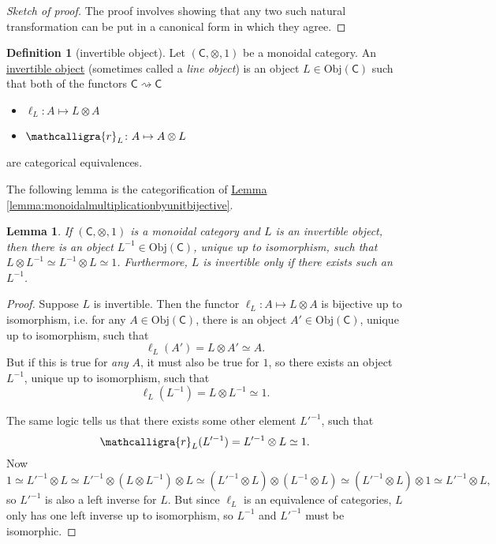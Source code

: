 \documentclass[a4paper]{report}
\newcommand{\sr}{\ensuremath{\mathcalligra{r}}}
\newcommand{\defn}[1]{\ul{#1}}
\newcommand{\Obj}{\mathrm{Obj}}
\theoremstyle{definition}
\newtheorem{definition}{Definition}[section]
\theoremstyle{plain}
\newtheorem{lemma}{Lemma}[section]
\theoremstyle{remark}
\begin{document}
\begin{proof}[Sketch of proof]
  The proof involves showing that any two such natural transformation can be put in a canonical form in which they agree.
\end{proof}

\begin{definition}[invertible object]
  \label{def:invertibleobject}
  Let $(\mathsf{C}, \otimes, 1)$ be a monoidal category. An \defn{invertible object} (sometimes called a \emph{line object}) is an object $L \in \Obj(\mathsf{C})$ such that both of the functors $\mathsf{C} \rightsquigarrow \mathsf{C}$
  \begin{itemize}
    \item $\ell_{L}\colon A \mapsto L \otimes A$ 
    \item $\sr_{L}\colon A \mapsto A \otimes L$
  \end{itemize}
  are categorical equivalences.
\end{definition}

The following lemma is the categorification of \hyperref[lemma:monoidalmultiplicationbyunitbijective]{Lemma \ref*{lemma:monoidalmultiplicationbyunitbijective}}.
\begin{lemma}
  If $(\mathsf{C}, \otimes, 1)$ is a monoidal category and $L$ is an invertible object, then there is an object $L^{-1} \in \Obj(\mathsf{C})$, unique up to isomorphism, such that $L \otimes L^{-1} \simeq L^{-1} \otimes L \simeq 1$. Furthermore, $L$ is invertible only if there exists such an $L^{-1}$.
\end{lemma}
\begin{proof}
  Suppose $L$ is invertible. Then the functor $\ell_{L}\colon A \mapsto L \otimes A$ is bijective up to isomorphism, i.e. for any $A \in \Obj(\mathsf{C})$, there is an object $A' \in \Obj(\mathsf{C})$, unique up to isomorphism, such that
  \begin{equation*}
    \ell_{L}(A') = L \otimes A' \simeq A.
  \end{equation*}
  But if this is true for \emph{any} $A$, it must also be true for $1$, so there exists an object $L^{-1}$, unique up to isomorphism, such that
  \begin{equation*}
    \ell_{L}(L^{-1}) = L \otimes L^{-1} \simeq 1.
  \end{equation*}

  The same logic tells us that there exists some other element $L'^{-1}$, such that 
  \begin{equation*}
    \sr_{L}(L'^{-1}) = L'^{-1} \otimes L \simeq 1.
  \end{equation*}
  Now 
  \begin{equation*}
    1 \simeq L'^{-1} \otimes L \simeq L'^{-1} \otimes (L \otimes L^{-1}) \otimes L \simeq (L'^{-1} \otimes L) \otimes (L^{-1} \otimes L) \simeq (L'^{-1} \otimes L) \otimes 1 \simeq L'^{-1} \otimes L,
  \end{equation*}
  so $L'^{-1}$ is also a left inverse for $L$. But since $\ell_{L}$ is an equivalence of categories, $L$ only has one left inverse up to isomorphism, so $L^{-1}$ and $L'^{-1}$ must be isomorphic.
\end{proof}
\end{document}
